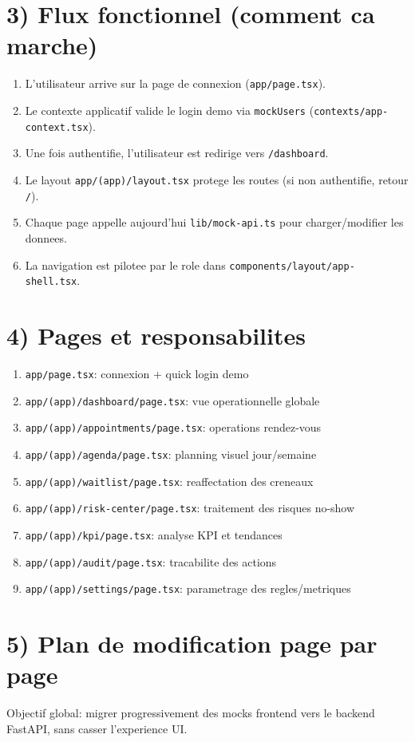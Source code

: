 \documentclass[11pt,a4paper]{article}
\begin{document}
\section*{3) Flux fonctionnel (comment ca marche)}
\begin{enumerate}[leftmargin=*]
  \item L'utilisateur arrive sur la page de connexion (\texttt{app/page.tsx}).
  \item Le contexte applicatif valide le login demo via \texttt{mockUsers} (\texttt{contexts/app-context.tsx}).
  \item Une fois authentifie, l'utilisateur est redirige vers \texttt{/dashboard}.
  \item Le layout \texttt{app/(app)/layout.tsx} protege les routes (si non authentifie, retour \texttt{/}).
  \item Chaque page appelle aujourd'hui \texttt{lib/mock-api.ts} pour charger/modifier les donnees.
  \item La navigation est pilotee par le role dans \texttt{components/layout/app-shell.tsx}.
\end{enumerate}

\section*{4) Pages et responsabilites}
\begin{enumerate}[leftmargin=*]
  \item \texttt{app/page.tsx}: connexion + quick login demo
  \item \texttt{app/(app)/dashboard/page.tsx}: vue operationnelle globale
  \item \texttt{app/(app)/appointments/page.tsx}: operations rendez-vous
  \item \texttt{app/(app)/agenda/page.tsx}: planning visuel jour/semaine
  \item \texttt{app/(app)/waitlist/page.tsx}: reaffectation des creneaux
  \item \texttt{app/(app)/risk-center/page.tsx}: traitement des risques no-show
  \item \texttt{app/(app)/kpi/page.tsx}: analyse KPI et tendances
  \item \texttt{app/(app)/audit/page.tsx}: tracabilite des actions
  \item \texttt{app/(app)/settings/page.tsx}: parametrage des regles/metriques
\end{enumerate}

\section*{5) Plan de modification page par page}
Objectif global: migrer progressivement des mocks frontend vers le backend FastAPI, sans casser l'experience UI.
\end{document}
